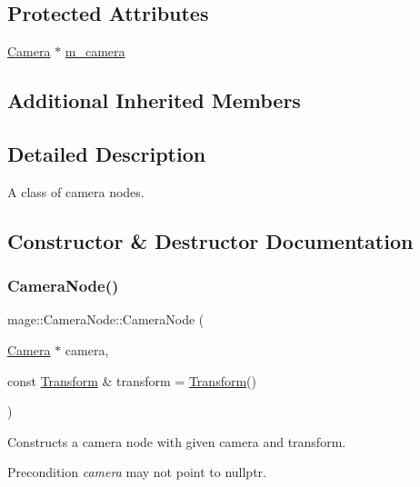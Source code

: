\subsection*{Protected Attributes}
\begin{DoxyCompactItemize}
\item 
\hyperlink{classmage_1_1_camera}{Camera} $\ast$ \hyperlink{classmage_1_1_camera_node_aee902112c2e70e8de69b69aed303ca1f}{m\+\_\+camera}
\end{DoxyCompactItemize}
\subsection*{Additional Inherited Members}


\subsection{Detailed Description}
A class of camera nodes. 

\subsection{Constructor \& Destructor Documentation}
\hypertarget{classmage_1_1_camera_node_aa6b469b939b268275665f5b962b82d4a}{}\label{classmage_1_1_camera_node_aa6b469b939b268275665f5b962b82d4a} 
\subsubsection{\texorpdfstring{Camera\+Node()}{CameraNode()}\hspace{0.1cm}{\footnotesize\ttfamily [1/2]}}
{\footnotesize\ttfamily mage\+::\+Camera\+Node\+::\+Camera\+Node (\begin{DoxyParamCaption}\item[{\hyperlink{classmage_1_1_camera}{Camera} $\ast$}]{camera,  }\item[{const \hyperlink{structmage_1_1_transform}{Transform} \&}]{transform = {\ttfamily \hyperlink{structmage_1_1_transform}{Transform}()} }\end{DoxyParamCaption})}

Constructs a camera node with given camera and transform.

\begin{DoxyPrecond}{Precondition}
{\itshape camera} may not point to {\ttfamily nullptr}. 
\end{DoxyPrecond}

